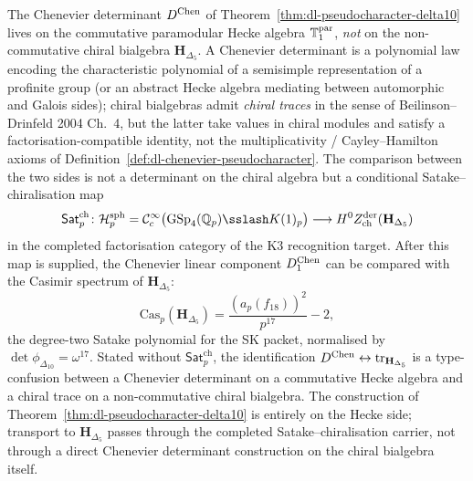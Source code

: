 \begin{remark}
\label{rem:dl-source-algebra-scope}
The Chenevier determinant $D^{\mathrm{Chen}}$ of
Theorem~\ref{thm:dl-pseudocharacter-delta10} lives on the
commutative paramodular Hecke algebra $\mathbb{T}^{\mathrm{par}}_1$, \emph{not} on the
non-commutative chiral bialgebra $\mathbf{H}_{\Delta_5}$.
A Chenevier determinant is a polynomial law encoding the
characteristic polynomial of a semisimple representation of a profinite
group (or an abstract Hecke algebra mediating between automorphic and
Galois sides); chiral bialgebras admit \emph{chiral traces} in the
sense of Beilinson--Drinfeld 2004 Ch.~4, but the latter take values in
chiral modules and satisfy a factorisation-compatible identity, not the
multiplicativity / Cayley--Hamilton axioms of
Definition~\ref{def:dl-chenevier-pseudocharacter}. The comparison
between the two sides is not a determinant on the chiral algebra but a
conditional Satake--chiralisation map
\[
 \mathsf{Sat}^{\mathrm{ch}}_p\colon
 \mathcal{H}^{\mathrm{sph}}_p
 =
 \mathcal{C}_c^\infty\bigl(\GSp_4(\mathbb{Q}_p)\sslash K(1)_p\bigr)
 \longrightarrow
 H^0 Z^{\mathrm{der}}_{\mathrm{ch}}(\mathbf{H}_{\Delta_5})
\]
in the completed factorisation category of the K3 recognition target.
After this map is supplied, the Chenevier linear component $D^{\mathrm{Chen}}_1$
can be compared with the Casimir spectrum of $\mathbf{H}_{\Delta_5}$:
\[
 \mathrm{Cas}_p(\mathbf{H}_{\Delta_5})
 =
 \frac{(a_p(f_{18}))^2}{p^{17}} - 2,
\]
the degree-two Satake polynomial for the SK packet, normalised by
\(\det\phi_{\Delta_{10}}=\omega^{17}\). Stated without
\(\mathsf{Sat}^{\mathrm{ch}}_p\), the identification $D^{\mathrm{Chen}}\leftrightarrow
\mathrm{tr}_{\mathbf{H}_{\Delta_5}}$ is a type-confusion between a
Chenevier determinant on a commutative Hecke algebra and a chiral
trace on a non-commutative chiral bialgebra. The construction of
Theorem~\ref{thm:dl-pseudocharacter-delta10} is entirely on the
Hecke side; transport to $\mathbf{H}_{\Delta_5}$ passes through the
completed Satake--chiralisation carrier, not through a direct
Chenevier determinant construction on the chiral bialgebra itself.
\end{remark}

